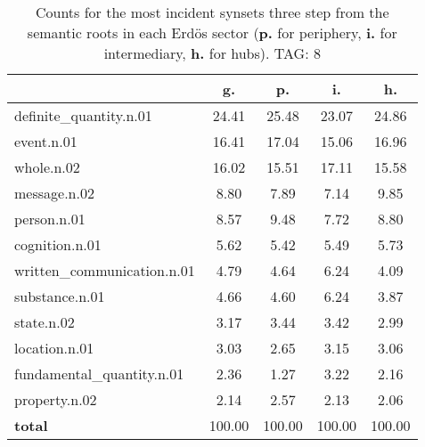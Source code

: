 \begin{table}[h!]
\begin{center}
\begin{tabular}{| l || c | c | c | c |}\hline
 & {\bf g.} & {\bf p.} & {\bf i.} & {\bf h.} \\\hline\hline
definite\_quantity.n.01 & 24.41  & 25.48  & 23.07  & 24.86 \\\hline
event.n.01 & 16.41  & 17.04  & 15.06  & 16.96 \\\hline
whole.n.02 & 16.02  & 15.51  & 17.11  & 15.58 \\\hline
message.n.02 & 8.80  & 7.89  & 7.14  & 9.85 \\\hline
person.n.01 & 8.57  & 9.48  & 7.72  & 8.80 \\\hline
cognition.n.01 & 5.62  & 5.42  & 5.49  & 5.73 \\\hline
written\_communication.n.01 & 4.79  & 4.64  & 6.24  & 4.09 \\\hline
substance.n.01 & 4.66  & 4.60  & 6.24  & 3.87 \\\hline
state.n.02 & 3.17  & 3.44  & 3.42  & 2.99 \\\hline
location.n.01 & 3.03  & 2.65  & 3.15  & 3.06 \\\hline
fundamental\_quantity.n.01 & 2.36  & 1.27  & 3.22  & 2.16 \\\hline
property.n.02 & 2.14  & 2.57  & 2.13  & 2.06 \\\hline\hline
{{\bf total}} & 100.00  & 100.00  & 100.00  & 100.00 \\\hline
\end{tabular}
\caption{Counts for the most incident synsets three step from the semantic roots in each Erd\"os sector ({\bf p.} for periphery, {\bf i.} for intermediary, {\bf h.} for hubs). TAG: 8}
\end{center}
\end{table}
